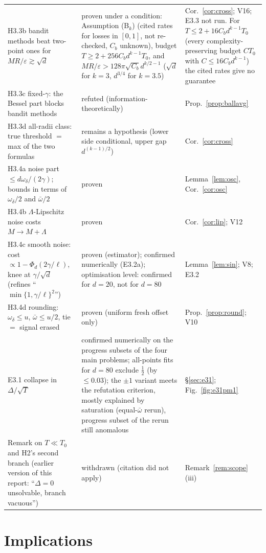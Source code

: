 \documentclass[11pt,a4paper]{article}
\numberwithin{equation}{section}
\theoremstyle{definition}
\theoremstyle{remark}
\newcommand{\wbar}{\bar\omega}\newcommand{\Atwo}{\cA^{\rm 2pt}_\gamma}
\begin{document}
{\begin{xltabular}{\textwidth}{@{}>{\raggedright\arraybackslash}p{5.3cm}>{\raggedright\arraybackslash}p{4.6cm}>{\raggedright\arraybackslash}X@{}}
H3.3b bandit methods beat two-point ones for $MR/\varepsilon\gtrsim\sqrt d$ & proven under a condition: Assumption (B$_k$) (cited rates for losses in $[0,1]$, not re-checked, $C_b$ unknown), budget $T\ge2+256C_bd^{k-1}T_0$, and $MR/\varepsilon>128\pi\sqrt{C_b}d^{k/2-1}$ ($\sqrt d$ for $k=3$, $d^{3/4}$ for $k=3.5$) & Cor.~\ref{cor:cross}; V16; E3.3 not run. For $T\le2+16C_bd^{k-1}T_0$ (every complexity-preserving budget $CT_0$ with $C\le16C_bd^{k-1}$) the cited rates give no guarantee\\
H3.3c fixed-$\gamma$: the Bessel part blocks bandit methods & refuted (information-theoretically) & Prop.~\ref{prop:ballavg}\\
H3.3d all-radii class: true threshold $=$ max of the two formulas & remains a hypothesis (lower side conditional, upper gap $d^{(k-1)/2}$) & Cor.~\ref{cor:cross}\\
H3.4a noise part $\le d\omega_\delta/(2\gamma)$; bounds in terms of $\omega_\delta/2$ and $\wbar/2$ & proven & Lemma~\ref{lem:osc}, Cor.~\ref{cor:osc}\\
H3.4b $\Lambda$-Lipschitz noise costs $M\to M+\Lambda$ & proven & Cor.~\ref{cor:lip}; V12\\
H3.4c smooth noise: cost $\propto1-\Phi_d(2\gamma/\ell)$, knee at $\gamma/\sqrt d$ (refines ``$\min\{1,\gamma/\ell\}^2$'') & proven (estimator); confirmed numerically (E3.2a); optimisation level: confirmed for $d=20$, not for $d=80$ & Lemma~\ref{lem:sin}; V8; E3.2\\
H3.4d rounding: $\omega_\delta\le u$, $\wbar\le u/2$, tie $=$ signal erased & proven (uniform fresh offset only) & Prop.~\ref{prop:round}; V10\\
E3.1 collapse in $\Delta/\sqrt T$ & confirmed numerically on the progress subsets of the four main problems; all-points fits for $d=80$ exclude $\frac12$ (by $\le0.03$); the $\pm1$ variant meets the refutation criterion, mostly explained by saturation (equal-$\wbar$ rerun), progress subset of the rerun still anomalous & \S\ref{sec:e31}; Fig.~\ref{fig:e31pm1}\\
Remark on $T\ll T_0$ and H2's second branch (earlier version of this report: ``$\Delta=0$ unsolvable, branch vacuous'') & withdrawn (citation did not apply) & Remark~\ref{rem:scope}(iii)\\
\bottomrule
\end{xltabular}}

\section{Implications}\label{sec:contrib}
\end{document}
